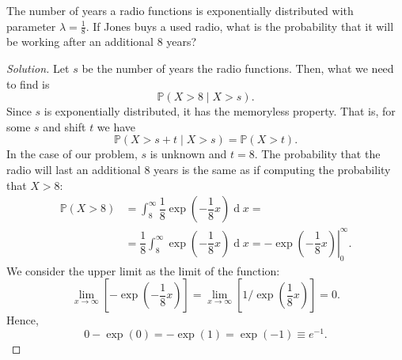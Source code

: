 \documentclass{article}[12pt]
\newenvironment{solution}
  {\renewcommand\qedsymbol{$\blacksquare$}\begin{proof}[Solution]}
  {\end{proof}}
\newenvironment{problem}[1]
  {\renewcommand\theinnercustomprblm{#1}\innercustomprblm}
  {\endinnercustomprblm}
\DeclareMathOperator{\dif}{d}
\renewcommand{\P}{\mathbb{P}}
\begin{document}
\begin{problem}{5.33}\normalfont
The number of years a radio functions is exponentially distributed with parameter $\lambda = \tfrac{1}{8}$.
If Jones buys a used radio, what is the probability that it will be working after an additional $8$ years?
\end{problem}
\begin{solution}
Let $s$ be the number of years the radio functions.
Then, what we need to find is
\begin{equation*}
    \P(X > 8\mid X > s).
\end{equation*}
Since $s$ is exponentially distributed, it has the memoryless property.
That is, for some $s$ and shift $t$ we have
\begin{equation*}
    \P(X > s + t\mid X > s) = \P(X > t).
\end{equation*}
In the case of our problem, $s$ is unknown and $t = 8$.
The probability that the radio will last an additional $8$ years is the same as if computing
the probability that $X > 8$:
\begin{align*}
    \P(X > 8) &= \int_{8}^{\infty}\dfrac{1}{8}\exp\left(-\dfrac{1}{8}x\right)\dif x =
    \\
    &= \dfrac{1}{8}\int_{8}^{\infty}\exp\left(-\dfrac{1}{8}x\right)\dif x = -\left.\exp\left(-\dfrac{1}{8}x\right)\right|_{0}^{\infty}.
\end{align*}
We consider the upper limit as the limit of the function:
\begin{equation*}
    \lim_{x\to\infty}\left[-\exp\left(-\dfrac{1}{8}x\right)\right] = \lim_{x\to\infty}\left[1\bigg/\exp\left(\dfrac{1}{8}x\right)\right] = 0.
\end{equation*}
Hence,
\begin{equation*}
    0 - \exp(0) = -\exp(1) = \exp(-1) \equiv e^{-1}.
\end{equation*}
\end{solution}
\end{document}
